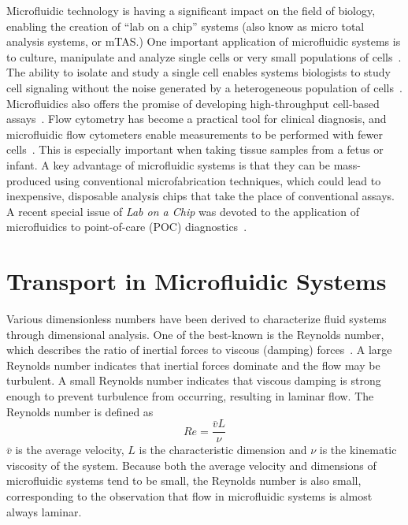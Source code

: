 Microfluidic technology is having a significant impact on the field
of biology, enabling the creation of {}``lab on a chip'' systems
(also know as micro total analysis systems, or \textgreek{m}TAS.)
One important application of microfluidic systems is to culture, manipulate
and analyze single cells or very small populations of cells~\cite{Yi2006}.
The ability to isolate and study a single cell enables systems biologists
to study cell signaling without the noise generated by a heterogeneous
population of cells~\cite{Breslauer2006}. Microfluidics also offers
the promise of developing high-throughput cell-based assays~\cite{Borland2008}.
Flow cytometry has become a practical tool for clinical diagnosis,
and microfluidic flow cytometers enable measurements to be performed
with fewer cells~\cite{Chung2007}. This is especially important
when taking tissue samples from a fetus or infant. A key advantage
of microfluidic systems is that they can be mass-produced using conventional
microfabrication techniques, which could lead to inexpensive, disposable
analysis chips that take the place of conventional assays. A recent
special issue of \emph{Lab on a Chip} was devoted to the application
of microfluidics to point-of-care (POC) diagnostics~\cite{Sia2008}.


\section{Transport in Microfluidic Systems}

Various dimensionless numbers have been derived to characterize fluid
systems through dimensional analysis. One of the best-known is the
Reynolds number, which describes the ratio of inertial forces to viscous
(damping) forces~\cite{fox2006}. A large Reynolds number indicates
that inertial forces dominate and the flow may be turbulent. A small
Reynolds number indicates that viscous damping is strong enough to
prevent turbulence from occurring, resulting in laminar flow. The
Reynolds number is defined as\[
Re=\frac{\bar{v}L}{\nu}\]
$\bar{v}$ is the average velocity, $L$ is the characteristic dimension
and $\nu$ is the kinematic viscosity of the system. Because both
the average velocity and dimensions of microfluidic systems tend to
be small, the Reynolds number is also small, corresponding to the
observation that flow in microfluidic systems is almost always laminar.

